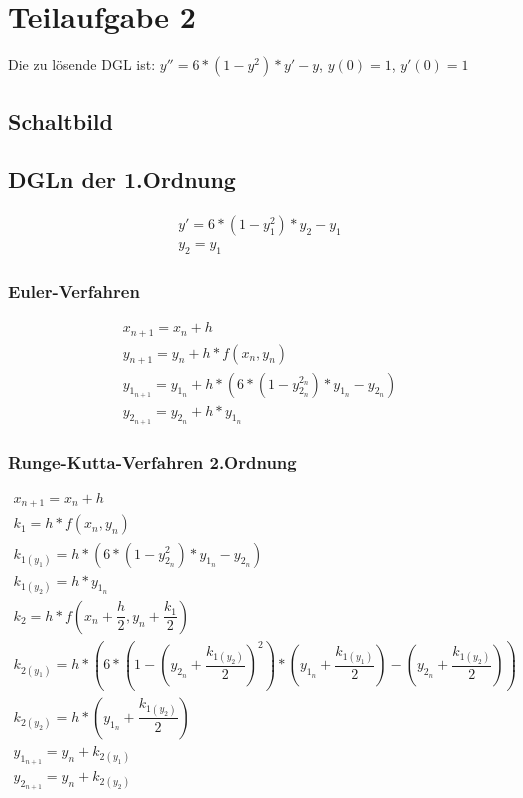 \documentclass[]{scrartcl}
\begin{document}
\section{Teilaufgabe 2}
Die zu lösende DGL ist:
$ y'' = 6 * (1 - y^{2}) * y' - y $,
$ y(0) = 1 $,
$ y'(0) = 1 $

\subsection{Schaltbild}

\subsection{DGLn der 1.Ordnung}
\begin{align}
y' = 6 * (1 - y_{1}^{2}) * y_{2} - y_{1} \\
y_{2} = y_{1}
\end{align}

\subsubsection{Euler-Verfahren}
\begin{align}
x_{n+1} = x_{n}+h \\
y_{n+1} = y_{n}+h*f(x_{n},y_{n}) \\
y_{1_{n+1}} = y_{1_{n}}+h*(6 * (1 - y_{2_{n}}^{2_{n}}) * y_{1_{n}} - y_{2_{n}}) \\
y_{2_{n+1}} = y_{2_{n}} + h * y_{1_{n}}
\end{align}

\subsubsection{Runge-Kutta-Verfahren 2.Ordnung}
\begin{align}
x_{n+1} = x_{n}+h \\
k_{1} = h*f(x_{n},y_{n}) \\
k_{1(y_{1})} = h * (6 * (1 - y_{2_{n}}^{2}) * y_{1_{n}} - y_{2_{n}}) \\
k_{1(y_{2})} = h * y_{1_{n}} \\
k_{2} = h*f(x_{n} + \dfrac{h}{2},y_{n} + \dfrac{k_{1}}{2}) \\
k_{2(y_{1})} = h * (6 * (1 - (y_{2_{n}} + \dfrac{k_{1(y_{2})}}{2})^{2}) * (y_{1_{n}} + \dfrac{k_{1(y_{1})}}{2}) - (y_{2_{n}} + \dfrac{k_{1(y_{2})}}{2})) \\
k_{2(y_{2})} = h * (y_{1_{n}} + \dfrac{k_{1(y_{2})}}{2}) \\
y_{1_{n+1}} = y_{n}+k_{2(y_{1})} \\
y_{2_{n+1}} = y_{n}+k_{2(y_{2})}
\end{align}
\end{document}
